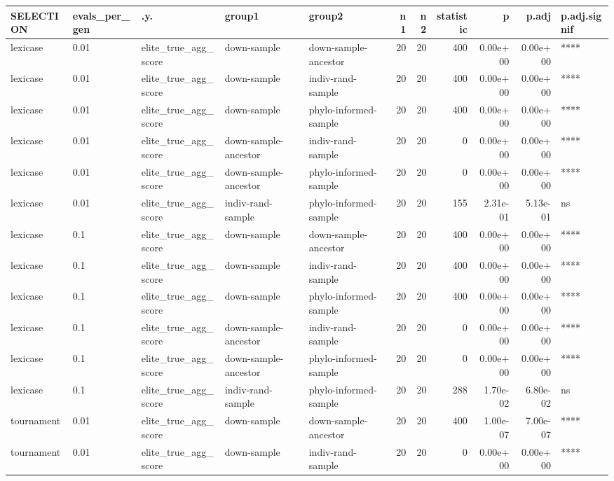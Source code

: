 \documentclass[
]{book}
\begin{document}
\begin{tabular}{l|l|l|l|l|r|r|r|r|r|l}
\hline
SELECTION & evals\_per\_gen & .y. & group1 & group2 & n1 & n2 & statistic & p & p.adj & p.adj.signif\\
\hline
lexicase & 0.01 & elite\_true\_agg\_score & down-sample & down-sample-ancestor & 20 & 20 & 400 & 0.00e+00 & 0.00e+00 & ****\\
\hline
lexicase & 0.01 & elite\_true\_agg\_score & down-sample & indiv-rand-sample & 20 & 20 & 400 & 0.00e+00 & 0.00e+00 & ****\\
\hline
lexicase & 0.01 & elite\_true\_agg\_score & down-sample & phylo-informed-sample & 20 & 20 & 400 & 0.00e+00 & 0.00e+00 & ****\\
\hline
lexicase & 0.01 & elite\_true\_agg\_score & down-sample-ancestor & indiv-rand-sample & 20 & 20 & 0 & 0.00e+00 & 0.00e+00 & ****\\
\hline
lexicase & 0.01 & elite\_true\_agg\_score & down-sample-ancestor & phylo-informed-sample & 20 & 20 & 0 & 0.00e+00 & 0.00e+00 & ****\\
\hline
lexicase & 0.01 & elite\_true\_agg\_score & indiv-rand-sample & phylo-informed-sample & 20 & 20 & 155 & 2.31e-01 & 5.13e-01 & ns\\
\hline
lexicase & 0.1 & elite\_true\_agg\_score & down-sample & down-sample-ancestor & 20 & 20 & 400 & 0.00e+00 & 0.00e+00 & ****\\
\hline
lexicase & 0.1 & elite\_true\_agg\_score & down-sample & indiv-rand-sample & 20 & 20 & 400 & 0.00e+00 & 0.00e+00 & ****\\
\hline
lexicase & 0.1 & elite\_true\_agg\_score & down-sample & phylo-informed-sample & 20 & 20 & 400 & 0.00e+00 & 0.00e+00 & ****\\
\hline
lexicase & 0.1 & elite\_true\_agg\_score & down-sample-ancestor & indiv-rand-sample & 20 & 20 & 0 & 0.00e+00 & 0.00e+00 & ****\\
\hline
lexicase & 0.1 & elite\_true\_agg\_score & down-sample-ancestor & phylo-informed-sample & 20 & 20 & 0 & 0.00e+00 & 0.00e+00 & ****\\
\hline
lexicase & 0.1 & elite\_true\_agg\_score & indiv-rand-sample & phylo-informed-sample & 20 & 20 & 288 & 1.70e-02 & 6.80e-02 & ns\\
\hline
tournament & 0.01 & elite\_true\_agg\_score & down-sample & down-sample-ancestor & 20 & 20 & 400 & 1.00e-07 & 7.00e-07 & ****\\
\hline
tournament & 0.01 & elite\_true\_agg\_score & down-sample & indiv-rand-sample & 20 & 20 & 0 & 0.00e+00 & 0.00e+00 & ****\\

\end{tabular}
\end{document}
